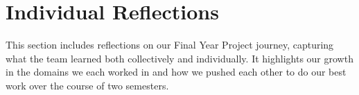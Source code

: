 
\section{Individual Reflections}

This section includes reflections on our Final Year Project journey, capturing what the team learned both collectively and individually. It highlights our growth in the domains we each worked in and how we pushed each other to do our best work over the course of two semesters.

